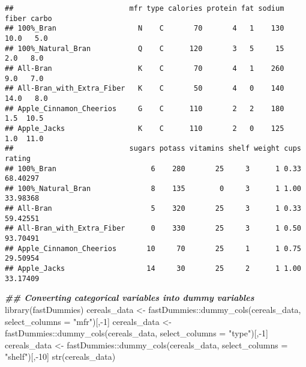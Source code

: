 \documentclass[
]{article}
\newenvironment{Shaded}{\begin{snugshade}}{\end{snugshade}}
\newcommand{\AttributeTok}[1]{\textcolor[rgb]{0.77,0.63,0.00}{#1}}
\newcommand{\DecValTok}[1]{\textcolor[rgb]{0.00,0.00,0.81}{#1}}
\newcommand{\DocumentationTok}[1]{\textcolor[rgb]{0.56,0.35,0.01}{\textbf{\textit{#1}}}}
\newcommand{\FunctionTok}[1]{\textcolor[rgb]{0.00,0.00,0.00}{#1}}
\newcommand{\NormalTok}[1]{#1}
\newcommand{\OtherTok}[1]{\textcolor[rgb]{0.56,0.35,0.01}{#1}}
\newcommand{\SpecialCharTok}[1]{\textcolor[rgb]{0.00,0.00,0.00}{#1}}
\newcommand{\StringTok}[1]{\textcolor[rgb]{0.31,0.60,0.02}{#1}}
\begin{document}
\begin{verbatim}
##                           mfr type calories protein fat sodium fiber carbo
## 100%_Bran                   N    C       70       4   1    130  10.0   5.0
## 100%_Natural_Bran           Q    C      120       3   5     15   2.0   8.0
## All-Bran                    K    C       70       4   1    260   9.0   7.0
## All-Bran_with_Extra_Fiber   K    C       50       4   0    140  14.0   8.0
## Apple_Cinnamon_Cheerios     G    C      110       2   2    180   1.5  10.5
## Apple_Jacks                 K    C      110       2   0    125   1.0  11.0
##                           sugars potass vitamins shelf weight cups   rating
## 100%_Bran                      6    280       25     3      1 0.33 68.40297
## 100%_Natural_Bran              8    135        0     3      1 1.00 33.98368
## All-Bran                       5    320       25     3      1 0.33 59.42551
## All-Bran_with_Extra_Fiber      0    330       25     3      1 0.50 93.70491
## Apple_Cinnamon_Cheerios       10     70       25     1      1 0.75 29.50954
## Apple_Jacks                   14     30       25     2      1 1.00 33.17409
\end{verbatim}

\begin{Shaded}
\begin{Highlighting}[]
\DocumentationTok{\#\# Converting categorical variables into dummy variables }
\FunctionTok{library}\NormalTok{(fastDummies)}
\NormalTok{cereals\_data }\OtherTok{\textless{}{-}}\NormalTok{ fastDummies}\SpecialCharTok{::}\FunctionTok{dummy\_cols}\NormalTok{(cereals\_data, }\AttributeTok{select\_columns =} \StringTok{"mfr"}\NormalTok{)[,}\SpecialCharTok{{-}}\DecValTok{1}\NormalTok{]}
\NormalTok{cereals\_data }\OtherTok{\textless{}{-}}\NormalTok{ fastDummies}\SpecialCharTok{::}\FunctionTok{dummy\_cols}\NormalTok{(cereals\_data, }\AttributeTok{select\_columns =} \StringTok{"type"}\NormalTok{)[,}\SpecialCharTok{{-}}\DecValTok{1}\NormalTok{]}
\NormalTok{cereals\_data }\OtherTok{\textless{}{-}}\NormalTok{ fastDummies}\SpecialCharTok{::}\FunctionTok{dummy\_cols}\NormalTok{(cereals\_data, }\AttributeTok{select\_columns =} \StringTok{"shelf"}\NormalTok{)[,}\SpecialCharTok{{-}}\DecValTok{10}\NormalTok{]}
\FunctionTok{str}\NormalTok{(cereals\_data)}
\end{Highlighting}
\end{Shaded}
\end{document}
